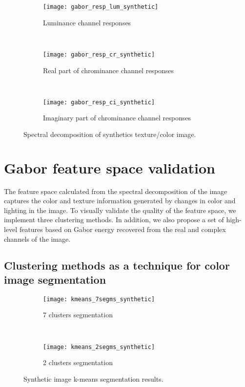 \begin{figure}[!ht]
    \centering
    \begin{subfigure}[b]{\textwidth}
        \texttt{[image: gabor\_resp\_lum\_synthetic]}
        \caption{Luminance channel responses}
    \end{subfigure} \\    
    \begin{subfigure}[b]{\textwidth}
    	\texttt{[image: gabor\_resp\_cr\_synthetic]}
        \caption{Real part of chrominance channel responses}
    \end{subfigure} \\    	
    \begin{subfigure}[b]{\textwidth}
        \texttt{[image: gabor\_resp\_ci\_synthetic]}
        \caption{Imaginary part of chrominance channel responses}
    \end{subfigure} 
    	    
    \caption{Spectral decomposition of synthetics texture/color image.}\label{fig:synthetic_img_gresponses}    
\end{figure}



\section{Gabor feature space validation}
The feature space calculated from the spectral decomposition of the image captures the color and texture information generated by changes in color and lighting in the image. To visually validate the quality of the feature space, we implement three clustering methods. In addition, we also propose a set of high-level features based on Gabor energy recovered from the real and complex channels of the image.

\subsection{Clustering methods as a technique for color image segmentation}

\begin{figure}[!ht]
    \centering
    \begin{subfigure}[b]{\textwidth}
        \texttt{[image: kmeans\_7segms\_synthetic]}
        \caption{7 clusters segmentation}
    \end{subfigure} \\    
    \begin{subfigure}[b]{\textwidth}
    	\texttt{[image: kmeans\_2segms\_synthetic]}
        \caption{2 clusters segmentation}
    \end{subfigure} 
        	    
    \caption{Synthetic image k-means segmentation results.}\label{fig:ckmeans_segms_synthetic_img}    
\end{figure}


